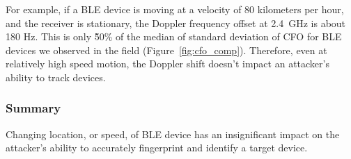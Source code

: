 For example, if a BLE device is moving at a velocity of 80
kilometers per hour,  and the receiver is stationary, the Doppler frequency
offset at 2.4~GHz is about 180 Hz. This is only \~50\% of the median of standard
deviation of CFO for BLE devices we observed in the field
(Figure~\ref{fig:cfo_comp}). Therefore, even at
relatively high speed motion, the Doppler shift doesn't impact an attacker's
ability to track devices.
    
\subsubsection*{Summary} 
Changing location, or speed, of BLE device has an insignificant impact on the
attacker's ability to accurately fingerprint and identify a target device.
    
    
